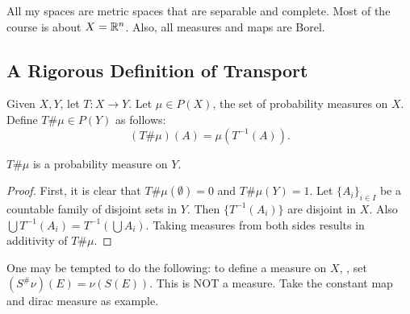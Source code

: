 \begin{remark}
    All my spaces are metric spaces that are separable and complete. Most of the course is about $X = \mathbb{R}^n$. Also, all measures  and maps are Borel.
\end{remark}

\subsection{A Rigorous Definition of Transport}
\begin{definition}
    Given $X,Y$, let $T:X\to Y$. Let $\mu \in P(X)$, the set of probability measures on $X$. Define $T\#\mu \in P(Y)$ as follows:
    \[
        (T\#\mu)(A) = \mu(T^{-1}(A)).
    \] 
\end{definition}
\begin{lemma}
    $T\#\mu$ is a probability measure on $Y$.
\end{lemma}
\begin{proof}
    First, it is clear that $T\#\mu(\emptyset) = 0$ and $T\#\mu(Y) = 1$. Let $\{A_i\}_{i\in I}$ be a countable family of disjoint sets in $Y$. Then $\{T^{-1}(A_i)\}$ are disjoint in $X$. Also $\bigcup T^{-1}(A_i) = T^{-1}(\bigcup A_i)$. Taking measures from both sides results in additivity of $T\#\mu$.  
\end{proof}

\begin{remark}
    One may be tempted to do the following: to define a measure on $X$, \eg, set $(S^\#\nu)(E) = \nu(S(E))$. This is NOT a measure. Take the constant map and dirac measure as example. 
\end{remark}

